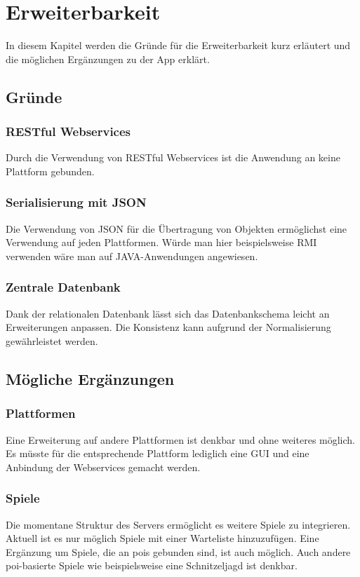 \chapter{Erweiterbarkeit}
In diesem Kapitel werden die Gründe für die Erweiterbarkeit kurz erläutert und die möglichen Ergänzungen zu der App erklärt.

\section{Gründe}
\subsection{RESTful Webservices}
Durch die Verwendung von RESTful Webservices ist die Anwendung an keine Plattform gebunden.

\subsection{Serialisierung mit JSON}
Die Verwendung von JSON für die Übertragung von Objekten ermöglichst eine Verwendung auf jeden Plattformen. Würde man hier beispielsweise RMI verwenden wäre man auf JAVA-Anwendungen angewiesen.


\subsection{Zentrale Datenbank}
Dank der relationalen Datenbank lässt sich das Datenbankschema leicht an Erweiterungen anpassen. Die Konsistenz kann aufgrund der Normalisierung gewährleistet werden.

\section{Mögliche Ergänzungen}
\subsection{Plattformen}
Eine Erweiterung auf andere Plattformen ist denkbar und ohne weiteres möglich. Es müsste für die entsprechende Plattform lediglich eine GUI und eine Anbindung der Webservices gemacht werden.

\subsection{Spiele}
Die momentane Struktur des Servers ermöglicht es weitere Spiele zu integrieren. Aktuell ist es nur möglich Spiele mit einer Warteliste hinzuzufügen. Eine Ergänzung um Spiele, die an \glspl{poi} gebunden sind, ist auch möglich. Auch andere \gls{poi}-basierte Spiele wie beispielsweise eine Schnitzeljagd ist denkbar.

